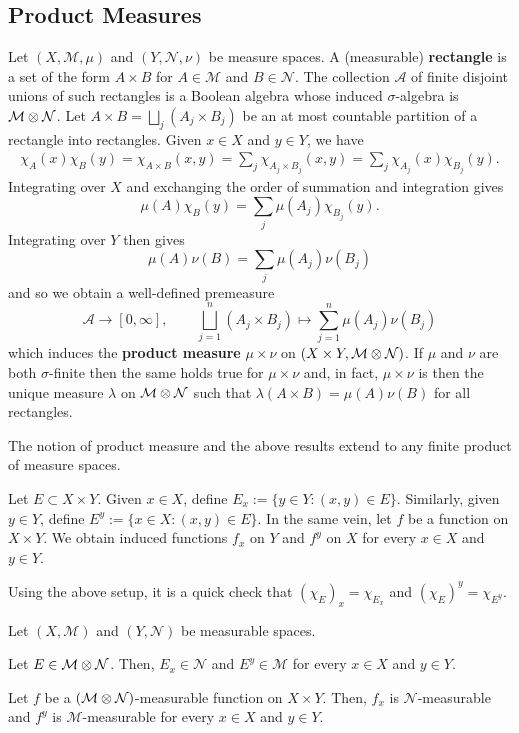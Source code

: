 \documentclass[11pt]{article}
\renewcommand{\A}{\mathcal{A}}
\newcommand{\M}{\mathcal{M}}
\renewcommand{\N}{\mathcal{N}}
\newcommand{\ssum}{\displaystyle\sum}
\begin{document}
\subsection{Product Measures}
Let $(X,\M,\mu)$ and $(Y,\N,\nu)$ be measure spaces. A (measurable) \textbf{rectangle} is a set of the form $A\times B$ for $A\in\M$ and $B\in\N$. The collection $\A$ of finite disjoint unions of such rectangles is a Boolean algebra whose induced $\sigma$-algebra is $\M\tensor\N$. Let $A\times B=\bigsqcup_j(A_j\times B_j)$ be an at most countable partition of a rectangle into rectangles. Given $x\in X$ and $y\in Y$, we have
\begin{align*}
\chi_A(x)\chi_B(y)
=\chi_{A\times B}(x,y)
=\ssum_j\chi_{A_j\times B_j}(x,y)
=\ssum_j\chi_{A_j}(x)\chi_{B_j}(y).
\end{align*}
Integrating over $X$ and exchanging the order of summation and integration gives
$$\mu(A)\chi_B(y)=\ssum_j\mu(A_j)\chi_{B_j}(y).$$
Integrating over $Y$ then gives
$$\mu(A)\nu(B)=\ssum_j\mu(A_j)\nu(B_j)$$
and so we obtain a well-defined premeasure 
$$\A\to[0,\infty],\qquad\bigsqcup_{j=1}^n(A_j\times B_j)\mapsto\ssum_{j=1}^n\mu(A_j)\nu(B_j)$$
which induces the \textbf{product measure} $\mu\times\nu$ on $(X\times Y,\M\tensor\N)$. If $\mu$ and $\nu$ are both $\sigma$-finite then the same holds true for $\mu\times\nu$ and, in fact, $\mu\times\nu$ is then the unique measure $\lambda$ on $\M\tensor\N$ such that $\lambda(A\times B)=\mu(A)\nu(B)$ for all rectangles.

\begin{remark}
The notion of product measure and the above results extend to any finite product of measure spaces.
\end{remark}

\begin{definition}
Let $E\subset X\times Y$. Given $x\in X$, define $E_x:=\{y\in Y : (x,y)\in E\}$. Similarly, given $y\in Y$, define $E^y:=\{x\in X : (x,y)\in E\}$. In the same vein, let $f$ be a function on $X\times Y$. We obtain induced functions $f_x$ on $Y$ and $f^y$ on $X$ for every $x\in X$ and $y\in Y$.
\end{definition}

Using the above setup, it is a quick check that $(\chi_E)_x=\chi_{E_x}$ and $(\chi_E)^y=\chi_{E^y}$.

\begin{proposition}
Let $(X,\M)$ and $(Y,\N)$ be measurable spaces.
\begin{enum}{\alph}
\item Let $E\in\M\tensor\N$. Then, $E_x\in\N$ and $E^y\in\M$ for every $x\in X$ and $y\in Y$.
\item Let $f$ be a $(\M\tensor\N)$-measurable function on $X\times Y$. Then, $f_x$ is $\N$-measurable and $f^y$ is $\M$-measurable for every $x\in X$ and $y\in Y$.
\end{enum}
\end{proposition}
\end{document}
